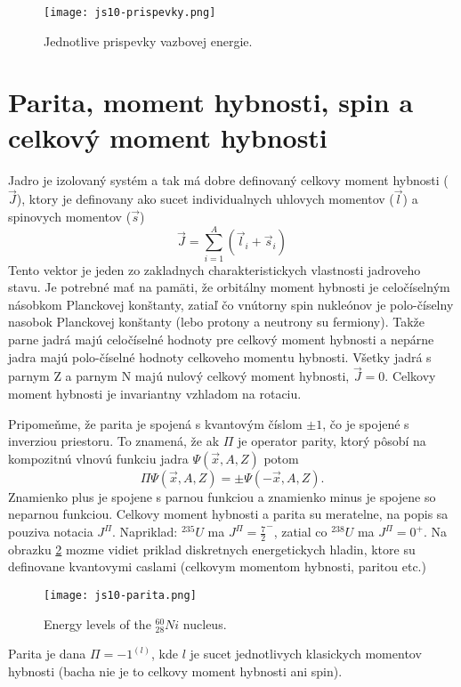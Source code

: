 \documentclass[../../main.tex]{subfiles}
\begin{document}
\begin{figure}[h]
 \centerline{\texttt{[image: js10-prispevky.png]}}
 \caption{Jednotlive prispevky vazbovej energie.}
 \label{js10:prispevky}
\end{figure}

\section{Parita, moment hybnosti, spin a celkový moment hybnosti}
Jadro je izolovaný systém a tak má dobre definovaný celkovy moment hybnosti ($\vec{J}$), ktory je definovany ako sucet individualnych uhlovych momentov ($\vec{l}$) a spinovych momentov ($\vec{s}$)
\begin{equation}
\vec{J}=\sum_{i=1}^{A}(\vec{l}_i+\vec{s}_i) 
\end{equation}
Tento vektor je jeden zo zakladnych charakteristickych vlastnosti jadroveho stavu. Je potrebné mať na pamäti, že orbitálny moment hybnosti je celočíselným násobkom Planckovej konštanty, zatiaľ čo vnútorny spin nukleónov je polo-číselny nasobok Planckovej konštanty (lebo protony a neutrony su fermiony). Takže parne jadrá majú celočíselné hodnoty pre celkový moment hybnosti a nepárne jadra majú polo-číselné hodnoty celkoveho momentu hybnosti. Všetky jadrá s parnym Z a parnym N majú nulový celkový  moment hybnosti, $\vec{J}=0$. Celkovy moment hybnosti je invariantny vzhladom na rotaciu. \par
Pripomeňme, že parita je spojená s kvantovým číslom $\pm1$, čo je spojené s inverziou priestoru. To znamená, že ak $\Pi$ je operator parity, ktorý pôsobí na kompozitnú vlnovú funkciu jadra $\Psi(\vec{x},A,Z)$
potom 
\begin{equation}
\Pi \Psi(\vec{x},A,Z)=\pm \Psi(-\vec{x},A,Z).
\end{equation}
Znamienko plus je spojene s parnou funkciou a znamienko minus je spojene so neparnou funkciou. Celkovy moment hybnosti a parita su meratelne, na popis sa pouziva notacia $J^{\Pi}$. Napriklad: $^{235}U$ ma $J^{\Pi}=\frac{7}{2}^{-}$, zatial co $^{238}U$ ma $J^{\Pi}=0^{+}$. Na obrazku \ref{js10:spiny} mozme vidiet priklad diskretnych energetickych hladin, ktore su definovane kvantovymi caslami (celkovym momentom hybnosti, paritou etc.)
\begin{figure}[h]
 \centerline{\texttt{[image: js10-parita.png]}}
 \caption{Energy levels of the $_{28}^{60}Ni$ nucleus.}
 \label{js10:spiny}
\end{figure}
\newline
Parita je dana $\Pi=-1^{(l)}$, kde $l$ je sucet jednotlivych klasickych momentov hybnosti (bacha nie je to celkovy moment hybnosti ani spin).
\end{document}
